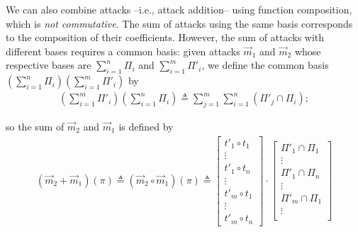 {{\begin{definition}[Attack]
We can also combine attacks --i.e., attack addition-- using function composition, which is \emph{not commutative}. The sum of attacks using the same basis corresponds to the composition of their coefficients. However, the sum of attacks with different bases requires a common basis: given attacks $\vec{m}_1$ and $\vec{m}_2$ whose respective bases are $\sum_{i=1}^n\Pi_i$ and $\sum_{i=1}^m\Pi'_i$, 
we define the common basis $(\sum_{i=1}^n\Pi_i)(\sum_{i=1}^m\Pi'_i)$ by 
\begin{align}
  \left(\sum_{i=1}^m\Pi'_i\right)\left(\sum_{i=1}^n\Pi_i\right)\triangleq \sum_{j=1}^m\sum_{i=1}^n(\Pi'_j\cap\Pi_i);
\end{align}

so the sum of $\vec{m}_2$ and $\vec{m}_1$ is defined by
\begin{align}
  (\vec{m}_2+\vec{m}_1)(\pi)\triangleq(\vec{m}_2\circ\vec{m}_1)(\pi)\triangleq
  \begin{bmatrix}
    t'_{1}\circ t_1 \\
    \vdots \\
    t'_{1}\circ t_n\\
    \vdots \\
    t'_{m}\circ t_1 \\
    \vdots \\
    t'_{m}\circ t_n
  \end{bmatrix}
  \cdot
  \begin{bmatrix}
    \Pi'_{1}\cap\Pi_{1} \\
    \vdots \\
    \Pi'_{1}\cap\Pi_{n}\\
    \vdots \\
    \Pi'_{m}\cap\Pi_{1} \\
    \vdots \\

\end{bmatrix}
\end{align}
\end{definition}}}
